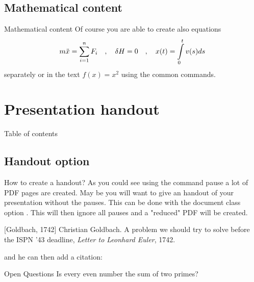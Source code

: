 \documentclass{beamer}
\begin{document}

\subsection[Math]{Mathematical content}
\begin{frame}{Mathematical content}
Of course you are able to create also equations
\begin{equation}
	m \ddot{x} = \sum_{i=1}^n F_i \quad , \quad
	\delta H = 0 \quad , \quad
	x(t) = \int_0^t\limits{ v(s) }ds
\end{equation}
separately or in the text $f(x)=x^2$ using the common commands.
\end{frame}


\section[Handout]{Presentation handout}

\begin{frame}{Table of contents}
\end{frame}


\subsection{Handout option}
\begin{frame}{How to create a handout?}
As you could see using the command pause a lot of PDF pages are created. May be you will want to give an handout of your presentation without the pauses. This can be done with the document class option . This will then ignore all pauses and a "reduced" PDF will be created.
\end{frame}


\begin{frame}
 
 \begin{thebibliography}{10}
[Goldbach, 1742]
Christian Goldbach.
\newblock A problem we should try to solve before the ISPN ’43 deadline,
\newblock \emph{Letter to Leonhard Euler}, 1742.
\end{thebibliography}
and he can then add a citation:
\begin{block}{Open Questions}
Is every even number the sum of two primes?
\cite{Goldbach1742}
\end{block}
\end{frame}
\end{document}
